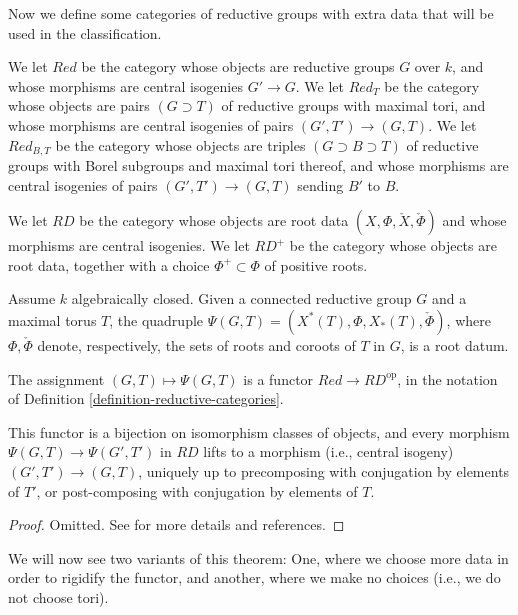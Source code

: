 Now we define some categories of reductive groups with extra data that will be used in the classification.

\begin{definition}
 \label{definition-reductive-categories}
We let $Red$ be the category whose objects are reductive groups $G$ over $k$, and whose morphisms are central isogenies $G'\to G$. We let $Red_T$ be the category whose objects are pairs $(G\supset T)$ of reductive groups with maximal tori, and whose morphisms are central isogenies of pairs $(G',T')\to (G,T)$. We let $Red_{B,T}$ be the category whose objects are triples $(G\supset B\supset T)$ of reductive groups with Borel subgroups and maximal tori thereof, and whose morphisms are central isogenies of pairs $(G',T')\to (G,T)$ sending $B'$ to $B$.

We let $RD$ be the category whose objects are root data $(X,\Phi, \check X,\check\Phi)$ and whose morphisms are central isogenies. We let $RD^+$ be the category whose objects are root data, together with a choice $\Phi^+\subset \Phi$ of positive roots.
\end{definition}


\begin{theorem}
\label{theorem-classification-reductive}
 Assume $k$ algebraically closed. Given a connected reductive group $G$ and a maximal torus $T$, the quadruple $\Psi(G,T)=(X^*(T), \Phi, X_*(T), \check\Phi)$, where $\Phi,\check\Phi$ denote, respectively, the sets of roots and coroots of $T$ in $G$, is a root datum.
 
 The assignment $(G,T)\mapsto \Psi(G,T)$ is a functor $Red \to RD^{\text{op}}$, in the notation of Definition \ref{definition-reductive-categories}.
 
 This functor is a bijection on isomorphism classes of objects, and every morphism $\Psi(G,T)\to \Psi(G',T')$ in $RD$ lifts to a morphism (i.e., central isogeny) $(G',T')\to (G,T)$, uniquely up to precomposing with conjugation by elements of $T'$, or post-composing with conjugation by elements of $T$.
\end{theorem}

\begin{proof}
 Omitted. See \cite{Springer-Corvallis} for more details and references.
\end{proof}

We will now see two variants of this theorem: One, where we choose more data in order to rigidify the functor, and another, where we make no choices (i.e., we do not choose tori).


